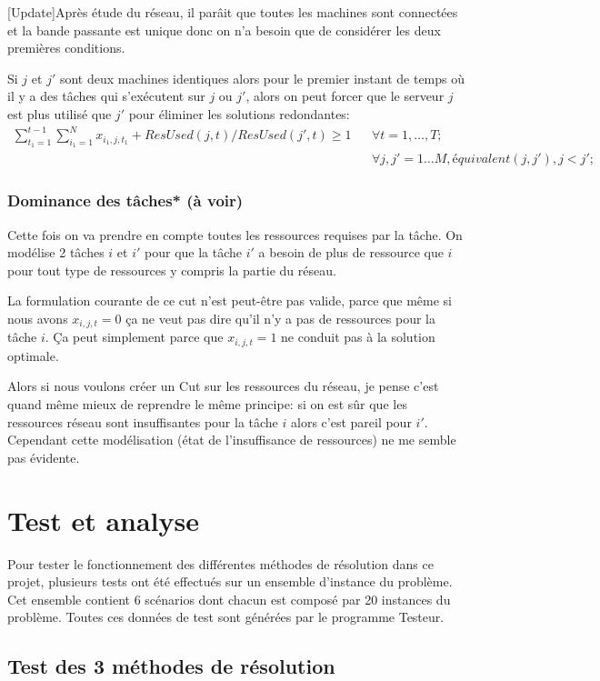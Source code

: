 \documentclass[twoside,fleqn]{EPURapport}
\begin{document}
[Update]Après étude du réseau, il parâit que toutes les machines sont connectées et la bande passante est unique donc on n'a besoin que de considérer les deux premières conditions.

Si $j$ et $j'$ sont deux machines identiques alors pour le premier instant de temps où il y a des tâches qui s'exécutent sur $j$ ou $j'$, alors on peut forcer que le serveur $j$ est plus utilisé que $j'$ pour éliminer les solutions redondantes:
\begin{align}
\sum_{t_1=1}^{t-1}\sum_{i_1=1}^{N}x_{i_1,j,t_1}+ ResUsed(j,t)/ResUsed(j',t) \geq 1
 && \forall t=1,\ldots,T;   \nonumber \\
 && \forall j,j'=1\ldots M, équivalent(j,j'), j<j';
\end{align}

\subsection{Dominance des tâches* (à voir)}
Cette fois on va prendre en compte toutes les ressources requises par la tâche. On modélise 2 tâches $i$ et $i\prime$ pour que la tâche $i\prime$ a besoin de plus de ressource que $i$ pour tout type de ressources y compris la partie du réseau.

La formulation courante de ce cut n'est peut-être pas valide, parce que même si nous avons $x_{i,j,t}=0$ ça ne veut pas dire qu'il n'y a pas de ressources pour la tâche $i$. Ça peut simplement parce que $x_{i,j,t}=1$ ne conduit pas à la solution optimale.

Alors si nous voulons créer un Cut sur les ressources du réseau, je pense c'est quand même mieux de reprendre le même principe: si on est sûr que les ressources réseau sont insuffisantes pour la tâche $i$ alors c'est pareil pour $i\prime$. Cependant cette modélisation (état de l'insuffisance de ressources) ne me semble pas évidente.


\chapter{Test et analyse}%
Pour tester le fonctionnement des différentes méthodes de résolution dans ce projet, plusieurs tests ont été effectués sur un ensemble d'instance du problème. Cet ensemble contient 6 scénarios dont chacun est composé par 20 instances du problème. Toutes ces données de test sont générées par le programme Testeur.

\section{Test des 3 méthodes de résolution}
\end{document}
